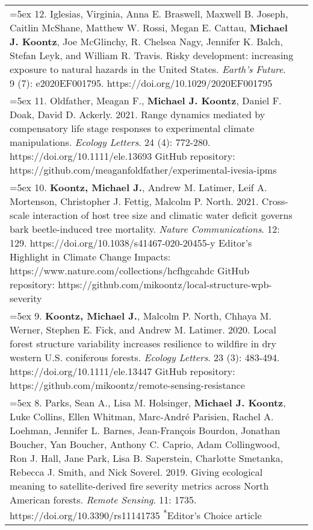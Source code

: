 \begin{longtable}{@{} >{\raggedright}p{6.25in} >{\raggedleft}X @{}}

\hangindent=5ex 12. Iglesias, Virginia, Anna E. Braswell, Maxwell B. Joseph, Caitlin McShane, Matthew W. Rossi, Megan E. Cattau, \textbf{Michael J. Koontz}, Joe McGlinchy, R. Chelsea Nagy, Jennifer K. Balch, Stefan Leyk, and William R. Travis. Risky development: increasing exposure to natural hazards in the United States. \emph{Earth's Future}. 9 (7): e2020EF001795. https://doi.org/10.1029/2020EF001795 & \tabularnewline

\hangindent=5ex 11. Oldfather, Meagan F., \textbf{Michael J. Koontz}, Daniel F. Doak, David D. Ackerly. 2021. Range dynamics mediated by compensatory life stage responses to experimental climate manipulations. \emph{Ecology Letters}. 24 (4): 772-280. https://doi.org/10.1111/ele.13693
\newline GitHub repository: https://github.com/meaganfoldfather/experimental-ivesia-ipms & \tabularnewline

\hangindent=5ex 10. \textbf{Koontz, Michael J.}, Andrew M. Latimer, Leif A. Mortenson, Christopher J. Fettig, Malcolm P. North. 2021. Cross-scale interaction of host tree size and climatic water deficit governs bark beetle-induced tree mortality. \emph{Nature Communications}. 12: 129. https://doi.org/10.1038/s41467-020-20455-y
\newline *Editor's Highlight in Climate Change Impacts: https://www.nature.com/collections/hcfhgcahdc
\newline GitHub repository: https://github.com/mikoontz/local-structure-wpb-severity & \tabularnewline

\hangindent=5ex 9. \textbf{Koontz, Michael J.}, Malcolm P. North, Chhaya M. Werner, Stephen E. Fick, and Andrew M. Latimer. 2020. Local forest structure variability increases resilience to wildfire in dry western U.S. coniferous forests. \emph{Ecology Letters}. 23 (3): 483-494. https://doi.org/10.1111/ele.13447 
\newline GitHub repository: https://github.com/mikoontz/remote-sensing-resistance & \tabularnewline

\hangindent=5ex 8. Parks, Sean A., Lisa M. Holsinger, \textbf{Michael J. Koontz}, Luke Collins, Ellen Whitman, Marc-Andr\'e Parisien, Rachel A. Loehman, Jennifer L. Barnes, Jean-Fran\c{c}ois Bourdon, Jonathan Boucher, Yan Boucher, Anthony C. Caprio, Adam Collingwood, Ron J. Hall, Jane Park, Lisa B. Saperstein, Charlotte Smetanka, Rebecca J. Smith, and Nick Soverel. 2019. Giving ecological meaning to satellite-derived fire severity metrics across North American forests. \emph{Remote Sensing}. 11: 1735. https://doi.org/10.3390/rs11141735 \newline \textsuperscript{*}Editor's Choice article & \tabularnewline


\end{longtable}
